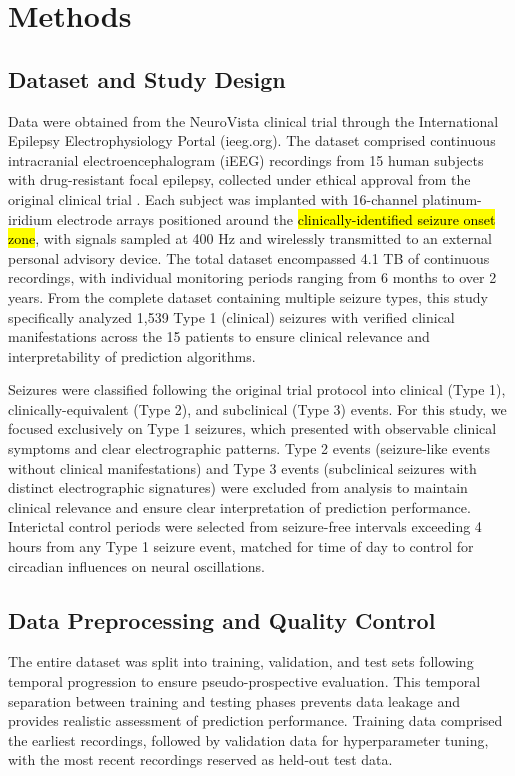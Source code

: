 \section{Methods}

\subsection{Dataset and Study Design}
Data were obtained from the NeuroVista clinical trial  through the International Epilepsy Electrophysiology Portal (ieeg.org). The dataset comprised continuous intracranial electroencephalogram (iEEG) recordings from 15 human subjects with drug-resistant focal epilepsy, collected under ethical approval from the original clinical trial . Each subject was implanted with 16-channel platinum-iridium electrode arrays positioned around the \hl{clinically-identified seizure onset zone}, with signals sampled at 400 Hz and wirelessly transmitted to an external personal advisory device. The total dataset encompassed 4.1 TB of continuous recordings, with individual monitoring periods ranging from 6 months to over 2 years. From the complete dataset containing multiple seizure types, this study specifically analyzed 1,539 Type 1 (clinical) seizures with verified clinical manifestations across the 15 patients to ensure clinical relevance and interpretability of prediction algorithms.

	Seizures were classified following the original trial protocol into clinical (Type 1), clinically-equivalent (Type 2), and subclinical (Type 3) events. For this study, we focused exclusively on Type 1 seizures, which presented with observable clinical symptoms and clear electrographic patterns. Type 2 events (seizure-like events without clinical manifestations) and Type 3 events (subclinical seizures with distinct electrographic signatures) were excluded from analysis to maintain clinical relevance and ensure clear interpretation of prediction performance. Interictal control periods were selected from seizure-free intervals exceeding 4 hours from any Type 1 seizure event, matched for time of day to control for circadian influences on neural oscillations.

\subsection{Data Preprocessing and Quality Control}
The entire dataset was split into training, validation, and test sets following temporal progression to ensure pseudo-prospective evaluation. This temporal separation between training and testing phases prevents data leakage and provides realistic assessment of prediction performance. Training data comprised the earliest recordings, followed by validation data for hyperparameter tuning, with the most recent recordings reserved as held-out test data.

